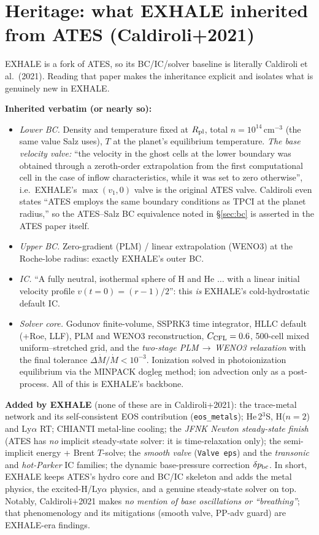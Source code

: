 \documentclass[english,a4paper]{my_memo}
\begin{document}
\section{Heritage: what EXHALE inherited from ATES (Caldiroli+2021)}
\label{sec:heritage}

EXHALE is a fork of ATES, so its BC/IC/solver baseline is
literally Caldiroli et al.\ (2021). Reading that paper makes the
inheritance explicit and isolates what is genuinely new in EXHALE.

\textbf{Inherited verbatim (or nearly so):}
\begin{itemize}
\item \emph{Lower BC.} Density and temperature fixed at $R_{\rm pl}$,
  total $n=10^{14}\,\mathrm{cm^{-3}}$ (the same value Salz uses), $T$ at
  the planet's equilibrium temperature. \emph{The base velocity valve:}
  ``the velocity in the ghost cells at the lower boundary was obtained
  through a zeroth-order extrapolation from the first computational cell
  in the case of inflow characteristics, while it was set to zero
  otherwise'', i.e.\ EXHALE's $\max(v_1,0)$ valve is the original
  ATES valve. Caldiroli even states ``ATES employs the same boundary
  conditions as TPCI at the planet radius,'' so the ATES--Salz BC
  equivalence noted in \S\ref{sec:bc} is asserted in the ATES paper
  itself.
\item \emph{Upper BC.} Zero-gradient (PLM) / linear extrapolation
  (WENO3) at the Roche-lobe radius: exactly EXHALE's outer BC.
\item \emph{IC.} ``A fully neutral, isothermal sphere of H and He
  $\ldots$ with a linear initial velocity profile $v(t{=}0)=(r-1)/2$'':
  this \emph{is} EXHALE's cold-hydrostatic default IC.
\item \emph{Solver core.} Godunov finite-volume, SSPRK3 time
  integrator, HLLC default (+Roe, LLF), PLM and WENO3 reconstruction,
  $C_{\rm CFL}=0.6$, 500-cell mixed uniform--stretched grid, and the
  \emph{two-stage PLM\,$\to$\,WENO3 relaxation} with the final
  tolerance $\Delta\dot M/\dot M<10^{-3}$. Ionization solved in
  photoionization equilibrium via the MINPACK dogleg method; ion
  advection only as a post-process. All of this is EXHALE's backbone.
\end{itemize}

\textbf{Added by EXHALE} (none of these are in Caldiroli+2021): the
trace-metal network and its self-consistent EOS contribution
(\texttt{eos\_metals}); He\,2$^3$S, H($n{=}2$) and Ly$\alpha$ RT;
CHIANTI metal-line cooling; the \emph{JFNK Newton steady-state finish}
(ATES has \emph{no} implicit steady-state solver: it is
time-relaxation only); the semi-implicit energy + Brent $T$-solve; the
\emph{smooth valve} (\texttt{Valve eps}) and the \emph{transonic} and
\emph{hot-Parker} IC families; the dynamic base-pressure correction
$\delta p_{\rm bc}$. In short, EXHALE keeps ATES's hydro core and BC/IC
skeleton and adds the metal physics, the excited-H/Ly$\alpha$ physics,
and a genuine steady-state solver on top. Notably, Caldiroli+2021 makes
\emph{no mention of base oscillations or ``breathing''}; that
phenomenology and its mitigations (smooth valve, PP-adv guard) are
EXHALE-era findings.
\end{document}
